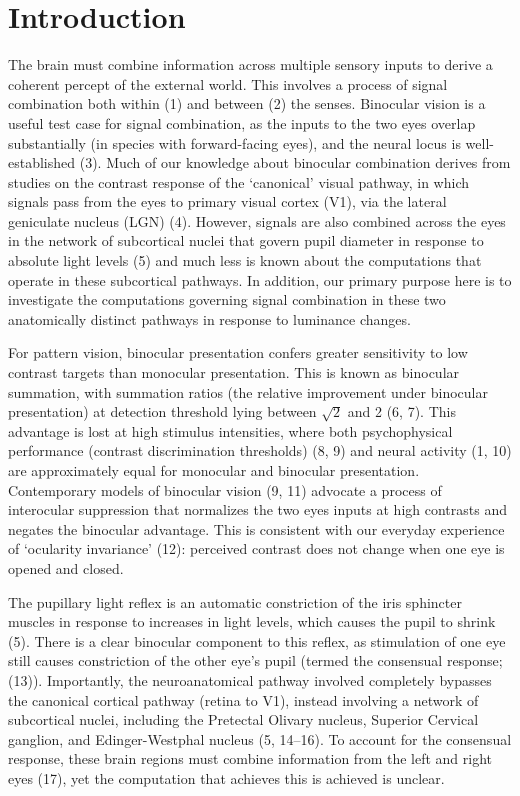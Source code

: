 \documentclass[
]{article}
\begin{document}
\hypertarget{introduction}{%
\section{Introduction}\label{introduction}}

The brain must combine information across multiple sensory inputs to derive a coherent percept of the external world. This involves a process of signal combination both within (1) and between (2) the senses. Binocular vision is a useful test case for signal combination, as the inputs to the two eyes overlap substantially (in species with forward-facing eyes), and the neural locus is well-established (3). Much of our knowledge about binocular combination derives from studies on the contrast response of the `canonical' visual pathway, in which signals pass from the eyes to primary visual cortex (V1), via the lateral geniculate nucleus (LGN) (4). However, signals are also combined across the eyes in the network of subcortical nuclei that govern pupil diameter in response to absolute light levels (5) and much less is known about the computations that operate in these subcortical pathways. In addition, our primary purpose here is to investigate the computations governing signal combination in these two anatomically distinct pathways in response to luminance changes.

For pattern vision, binocular presentation confers greater sensitivity to low contrast targets than monocular presentation. This is known as binocular summation, with summation ratios (the relative improvement under binocular presentation) at detection threshold lying between \(\sqrt{2}\) and 2 (6, 7). This advantage is lost at high stimulus intensities, where both psychophysical performance (contrast discrimination thresholds) (8, 9) and neural activity (1, 10) are approximately equal for monocular and binocular presentation. Contemporary models of binocular vision (9, 11) advocate a process of interocular suppression that normalizes the two eyes inputs at high contrasts and negates the binocular advantage. This is consistent with our everyday experience of `ocularity invariance' (12): perceived contrast does not change when one eye is opened and closed.

The pupillary light reflex is an automatic constriction of the iris sphincter muscles in response to increases in light levels, which causes the pupil to shrink (5). There is a clear binocular component to this reflex, as stimulation of one eye still causes constriction of the other eye's pupil (termed the consensual response; (13)). Importantly, the neuroanatomical pathway involved completely bypasses the canonical cortical pathway (retina to V1), instead involving a network of subcortical nuclei, including the Pretectal Olivary nucleus, Superior Cervical ganglion, and Edinger-Westphal nucleus (5, 14--16). To account for the consensual response, these brain regions must combine information from the left and right eyes (17), yet the computation that achieves this is achieved is unclear.
\end{document}
